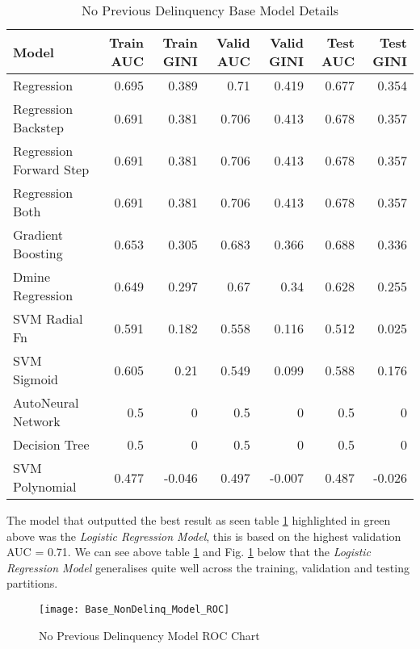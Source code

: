 \begin{table}[H]
	\centering
	\resizebox{\textwidth}{!}
	{
		\begin{tabular}{l | r | r| r |r| r|r}
			\hline
			\textbf{Model} & \textbf{Train AUC} & \textbf{Train GINI} & \textbf{Valid AUC} & \textbf{Valid GINI}& \textbf{Test AUC} & \textbf{Test GINI}\\
			\hline
			 \cellcolor{green!25}Regression & \cellcolor{green!25}0.695 & \cellcolor{green!25}0.389 & \cellcolor{green!25}0.71 & \cellcolor{green!25}0.419 & \cellcolor{green!25}0.677 & \cellcolor{green!25}0.354 \\
			Regression Backstep & 0.691 & 0.381 & 0.706 & 0.413 & 0.678 & 0.357 \\
			Regression Forward Step & 0.691 & 0.381 & 0.706 & 0.413 & 0.678 & 0.357 \\
			Regression Both & 0.691 & 0.381 & 0.706 & 0.413 & 0.678 & 0.357 \\
			Gradient Boosting & 0.653 & 0.305 & 0.683 & 0.366 & 0.688 & 0.336 \\
			Dmine Regression & 0.649 & 0.297 & 0.67 & 0.34 & 0.628 & 0.255 \\
			SVM Radial Fn & 0.591 & 0.182 & 0.558 & 0.116 & 0.512 & 0.025 \\
			SVM Sigmoid & 0.605 & 0.21 & 0.549 & 0.099 & 0.588 & 0.176 \\
			AutoNeural Network & 0.5 & 0 & 0.5 & 0 & 0.5 & 0 \\
			Decision Tree & 0.5 & 0 & 0.5 & 0 & 0.5 & 0 \\
			SVM Polynomial & 0.477 & -0.046 & 0.497 & -0.007 & 0.487 & -0.026 \\
			\hline
		\end{tabular}
	}
	\caption{No Previous Delinquency Base Model Details}
	\label{table:NoPreviousDelinquencyBaseModelDetails}
\end{table}

The model that outputted the best result as seen table \ref{table:NoPreviousDelinquencyBaseModelDetails} highlighted in green above  was the \textit{Logistic Regression Model}, this is based on the highest validation AUC = 0.71. We can see above table \ref{table:NoPreviousDelinquencyBaseModelDetails} and Fig. \ref{fig:NonDelinq_Model_ROC} below that the \textit{Logistic Regression Model} generalises quite well across the training, validation and testing partitions.

\begin{figure}[H]
	\texttt{[image: Base\_NonDelinq\_Model\_ROC]}
	\caption{No Previous Delinquency Model ROC Chart}
	\label{fig:NonDelinq_Model_ROC}
\end{figure}

